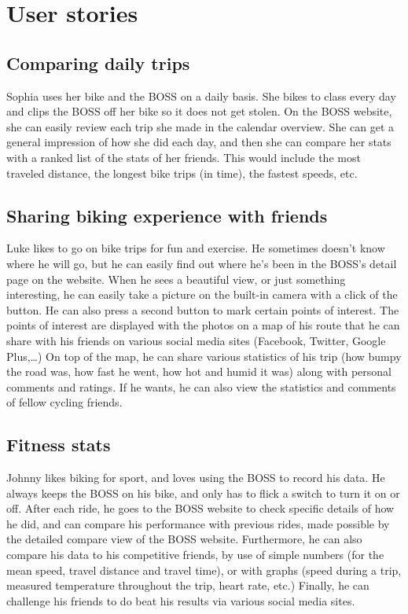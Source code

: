 \section{User stories}
\subsection{Comparing daily trips}
Sophia uses her bike and the BOSS on a daily basis. 
She bikes to class every day and clips the BOSS off her bike so it does not get stolen. 
On the BOSS website, she can easily review each trip she made in the calendar overview. 
She can get a general impression of how she did each day, and then she can compare her stats with a ranked list of the stats of her friends. 
This would include the most traveled distance, the longest bike trips (in time), the fastest speeds, etc.

\subsection{Sharing biking experience with friends}
Luke likes to go on bike trips for fun and exercise. 
He sometimes doesn’t know where he will go, but he can easily find out where he’s been in the BOSS’s detail page on the website. 
When he sees a beautiful view, or just something interesting, he can easily take a picture on the built-in camera with a click of the button. 
He can also press a second button to mark certain points of interest. 
The points of interest are displayed with the photos on a map of his route that he can share with his friends on various social media sites (Facebook, Twitter, Google Plus,…) On top of the map, he can share various statistics of his trip (how bumpy the road was, how fast he went, how hot and humid it was) along with personal comments and ratings. 
If he wants, he can also view the statistics and comments of fellow cycling friends. 

\subsection{Fitness stats}
Johnny likes biking for sport, and loves using the BOSS to record his data. 
He always keeps the BOSS on his bike, and only has to flick a switch to turn it on or off. 
After each ride, he goes to the BOSS website to check specific details of how he did, and can compare his performance with previous rides, made possible by the detailed compare view of the BOSS website. 
Furthermore, he can also compare his data to his competitive friends, by use of simple numbers (for the mean speed, travel distance and travel time), or with graphs (speed during a trip, measured temperature throughout the trip, heart rate, etc.) Finally, he can challenge his friends to do beat his results via various social media sites.
